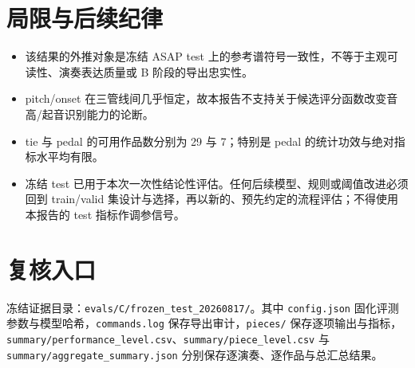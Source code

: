 \documentclass[UTF8,a4paper,11pt]{ctexart}
\begin{document}
\section{局限与后续纪律}
\begin{itemize}
  \item 该结果的外推对象是冻结 ASAP test 上的参考谱符号一致性，不等于主观可读性、演奏表达质量或 B 阶段的导出忠实性。
  \item pitch/onset 在三管线间几乎恒定，故本报告不支持关于候选评分函数改变音高/起音识别能力的论断。
  \item tie 与 pedal 的可用作品数分别为 29 与 7；特别是 pedal 的统计功效与绝对指标水平均有限。
  \item 冻结 test 已用于本次一次性结论性评估。任何后续模型、规则或阈值改进必须回到 train/valid 集设计与选择，再以新的、预先约定的流程评估；不得使用本报告的 test 指标作调参信号。
\end{itemize}

\section{复核入口}
冻结证据目录：\texttt{evals/C/frozen\_test\_20260817/}。其中 \texttt{config.json} 固化评测参数与模型哈希，\texttt{commands.log} 保存导出审计，\texttt{pieces/} 保存逐项输出与指标，\texttt{summary/performance\_level.csv}、\texttt{summary/piece\_level.csv} 与 \texttt{summary/aggregate\_summary.json} 分别保存逐演奏、逐作品与总汇总结果。
\end{document}
